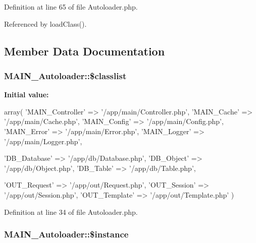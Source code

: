 Definition at line 65 of file Autoloader.php.

Referenced by loadClass().

\subsection{Member Data Documentation}
\hypertarget{classMAIN__Autoloader_a1ba4327fb805ecd48589610463c3a8c4}{
\subsubsection[{\$classlist}]{\setlength{\rightskip}{0pt plus 5cm}MAIN\_\-Autoloader::\$classlist}}
\label{dd/d71/classMAIN__Autoloader_a1ba4327fb805ecd48589610463c3a8c4}
{\bfseries Initial value:}
\begin{DoxyCode}
 array(
                        'MAIN_Controller' => '/app/main/Controller.php',
                        'MAIN_Cache'      => '/app/main/Cache.php',
                        'MAIN_Config'     => '/app/main/Config.php',
                        'MAIN_Error'      => '/app/main/Error.php',
                        'MAIN_Logger'     => '/app/main/Logger.php',

                        'DB_Database'     => '/app/db/Database.php',
                        'DB_Object'       => '/app/db/Object.php',
                        'DB_Table'        => '/app/db/Table.php',

                        'OUT_Request'     => '/app/out/Request.php',
                        'OUT_Session'     => '/app/out/Session.php',
                        'OUT_Template'    => '/app/out/Template.php' )
\end{DoxyCode}


Definition at line 34 of file Autoloader.php.\hypertarget{classMAIN__Autoloader_a00cdc353ce3e2665f86e87e3abb8bf0a}{
\subsubsection[{\$instance}]{\setlength{\rightskip}{0pt plus 5cm}MAIN\_\-Autoloader::\$instance}}
\label{dd/d71/classMAIN__Autoloader_a00cdc353ce3e2665f86e87e3abb8bf0a}


